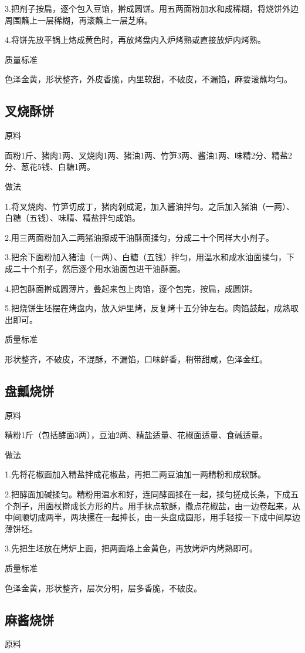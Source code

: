 \documentclass{ctexbook}
\begin{document}
3.把剂子按扁，逐个包入豆馅，擀成圆饼。用五两面粉加水和成稀糊，将烧饼外边周围蘸上一层稀糊，再滚蘸上一层芝麻。

4.将饼先放平锅上烙成黄色时，再放烤盘内入炉烤熟或直接放炉内烤熟。

质量标准

色泽金黄，形状整齐，外皮香脆，内里软甜，不破皮，不漏馅，麻要滚蘸均匀。
\subsection{叉烧酥饼}
原料

面粉1斤、猪肉1两、叉烧肉1两、猪油1两、竹笋3两、酱油1两、味精2分、精盐2分、葱花5钱、白糖1两。

做法

1.将叉烧肉、竹笋切成丁，猪肉剁成泥，加入酱油拌匀。之后加入猪油（一两）、白糖（五钱）、味精、精盐拌匀成馅。

2.用三两面粉加入二两猪油擦成干油酥面揉匀，分成二十个同样大小剂子。

3.把余下面粉加入猪油（一两）、白糖（五钱）拌匀，用温水和成水油面揉匀，下成二十个剂子，然后逐个用水油面包进干油酥面。

4.把包酥面擀成圆薄片，叠起来包上肉馅，逐个包完，按扁，成圆饼。

5.把烧饼生坯摆在烤盘内，放入炉里烤，反复烤十五分钟左右。肉馅鼓起，成熟取出即可。

质量标准

形状整齐，不破皮，不混酥，不漏馅，口味鲜香，稍带甜咸，色泽金红。
\subsection{盘瓤烧饼}
原料

精粉1斤（包括酵面3两），豆油2两、精盐适量、花椒面适量、食碱适量。

做法

1.先将花椒面加入精盐拌成花椒盐，再把二两豆油加一两精粉和成软酥。

2.把酵面加碱揉匀。精粉用温水和好，连同酵面揉在一起，揉匀搓成长条，下成五个剂子，用面杖擀成长方形的片。用手抹点软酥，撒点花椒盐，由一边卷起来，从中间顺切成两半，两块摞在一起抻长，由一头盘成圆形，用手轻按一下成中间厚边薄饼坯。

3.先把生坯放在烤炉上面，把两面烙上金黄色，再放烤炉内烤熟即可。

质量标准

色泽金黄，形状整齐，层次分明，层多香脆，不破皮。
\subsection{麻酱烧饼}
原料
\end{document}
